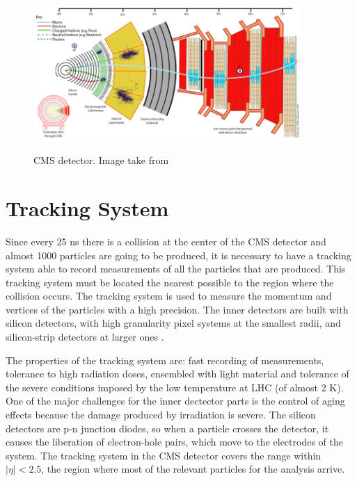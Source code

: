 
 \begin{figure}[h]
 \centering
 \caption{CMS detector. Image take from \cite{CMS_detector_slice}}
 \includegraphics[width=0.9\textwidth]{./Capitulos/CMS/CMS}  
 \label{CMS_detector}
 \end{figure}

\section{Tracking System}

Since every 25 ns there is a collision at the center of the CMS detector and almost 1000 particles are going to be produced, it is necessary to have a tracking system able to record measurements 
of all the particles that are produced. This tracking system must be located the nearest possible to the region where the collision occurs. The tracking system is used to measure the momentum and 
vertices of the particles with a high precision. The inner detectors are built with silicon detectors, with high granularity pixel systems at the smallest radii, and silicon-strip detectors at larger ones \cite{Perspectives_LHC}.

The properties of the tracking system are: fast recording of measurements, tolerance to high radiation doses, ensembled with light material and tolerance of the severe conditions imposed by the low temperature at LHC (of almost 2 K). One of the major challenges for the inner dectector parts is the control of aging effects because the damage produced by irradiation is severe. The silicon detectors are p-n junction diodes, so when a particle crosses the detector, it causes the liberation of electron-hole pairs, which move to the electrodes of the system. The tracking system in the CMS detector covers the range within $|\eta|<2.5$, the region where most of the relevant particles for the analysis arrive. 

